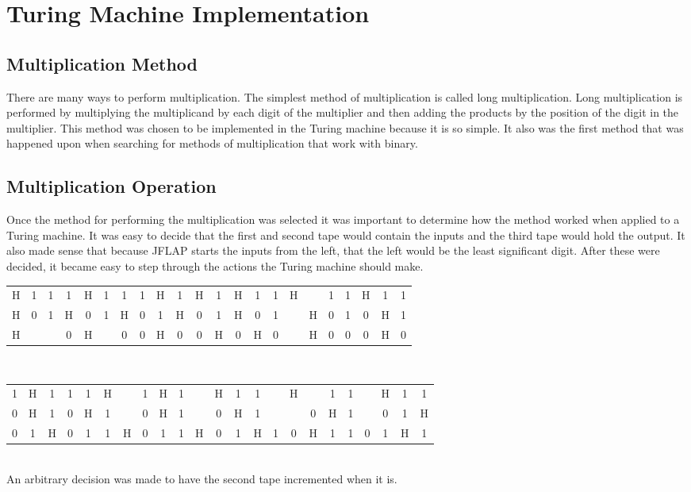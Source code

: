 \documentclass{article}
\begin{document}
\section{Turing Machine Implementation}
\subsection{Multiplication Method}
There are many ways to perform multiplication. The simplest method of multiplication is called long multiplication. Long multiplication is performed by multiplying the multiplicand by each digit of the multiplier and then adding the products by the position of the digit in the multiplier. This method was chosen to be implemented in the Turing machine because it is so simple. It also was the first method that was happened upon when searching for methods of multiplication that work with binary.
\subsection{Multiplication Operation}
Once the method for performing the multiplication was selected it was important to determine how the method worked when applied to a Turing machine. It was easy to decide that the first and second tape would contain the inputs and the third tape would hold the output. It also made sense that because JFLAP starts the inputs from the left, that the left would be the least significant digit. After these were decided, it became easy to step through the actions the Turing machine should make.\\
\begin{tabular}{ | c c c  | c c c | c c c | c c c | c c c | c c c c | c c c | }
\hline
H & 1 & 1 & 1 & H & 1 & 1 & 1 & H & 1 & H & 1 & H & 1 & 1 & H &  & 1 & 1 & H & 1 & 1 \\
H & 0 & 1 & H & 0 & 1 & H & 0 & 1 & H & 0 & 1 & H & 0 & 1 &  & H & 0 & 1 & 0 & H & 1 \\
H & & & 0 & H &  & 0 & 0 & H & 0 & 0 & H & 0 & H & 0 &  & H & 0 & 0 & 0 & H & 0 \\
\hline
\end{tabular}\\
\begin{tabular}{ | c c c | c c c c | c c c c | c c c c | c c c c | c c c c | }
\hline
1 & H & 1 & 1 & 1 & H &  & 1 & H & 1 & & H & 1 & 1 &  & H &  & 1 & 1 &  & H & 1 & 1 \\
0 & H & 1 & 0 & H & 1 &  & 0 & H & 1 & & 0 & H & 1 &  &  & 0 & H & 1 & & 0 & 1 & H \\
0 & 1 & H & 0 & 1 & 1 & H & 0 & 1 & 1 & H & 0 & 1 & H & 1 & 0 & H & 1 & 1 & 0 & 1 & H & 1 \\
\hline
\end{tabular}\\
An arbitrary decision was made to have the second tape incremented when it is.
\end{document}
